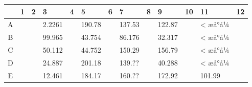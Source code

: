 \documentclass[UTF8,10pt,a4paper,fontset=fandol]{ctexart}
\renewcommand{\arraystretch}{1.15}
\newcommand{\fieldvalue}[1]{#1}
\begin{document}
\begin{center}
\scriptsize
\renewcommand{\arraystretch}{1.35}
\begin{tabular}{c|*{12}{p{}|}}
 &1&2&3&4&5&6&7&8&9&10&11&12\\ \hline
A&&&
\fieldvalue{2.2261}&&
\fieldvalue{190.78}&&
\fieldvalue{137.53}&&
\fieldvalue{122.87}&&
\fieldvalue{< æå°å¼}&\\ \hline
B&&&
\fieldvalue{99.965}&&
\fieldvalue{43.754}&&
\fieldvalue{86.176}&&
\fieldvalue{32.317}&&
\fieldvalue{< æå°å¼}&\\ \hline
C&&&
\fieldvalue{50.112}&&
\fieldvalue{44.752}&&
\fieldvalue{150.29}&&
\fieldvalue{156.79}&&
\fieldvalue{< æå°å¼}&\\ \hline
D&&&
\fieldvalue{24.887}&&
\fieldvalue{201.18}&&
\fieldvalue{139.??}&&
\fieldvalue{40.288}&&
\fieldvalue{< æå°å¼}&\\ \hline
E&&&
\fieldvalue{12.461}&&
\fieldvalue{184.17}&&
\fieldvalue{160.??}&&
\fieldvalue{172.92}&&
\fieldvalue{101.99}&\\ \hline

\end{tabular}
\end{center}
\end{document}
